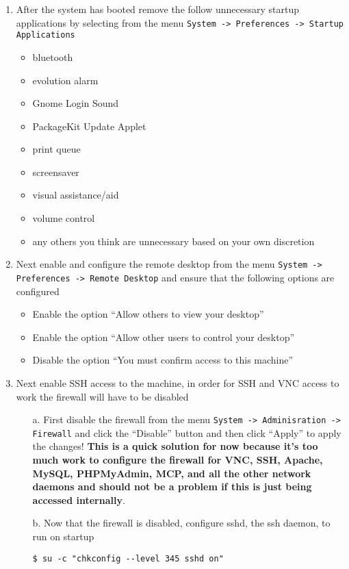 \begin{enumerate}
\item 	After the system has booted remove the follow unnecessary startup applications by selecting from the menu  
		\verb|System -> Preferences -> Startup Applications|
\begin{itemize}
\item	bluetooth
\item	evolution alarm
\item	Gnome Login Sound
\item	PackageKit Update Applet
\item	print queue
\item	screensaver
\item	visual assistance/aid
\item	volume control
\item	any others you think are unnecessary based on your own discretion
\end{itemize}

\item	Next enable and configure the remote desktop from the menu \verb|System -> Preferences -> Remote Desktop| and ensure
		that the following options are configured	
\begin{itemize}
\item	Enable the option ``Allow others to view your desktop''
\item	Enable the option ``Allow other users to control your desktop''
\item	Disable the option ``You must confirm access to this machine''
\end{itemize}

\item	Next enable SSH access to the machine, in order for SSH and VNC access to work the firewall will have to be disabled
\begin{itemize}
\item[a.]	First disable the firewall from the menu \verb|System -> Adminisration -> Firewall| and click the ``Disable'' 
			button and then click ``Apply'' to apply the changes! {\bf This is a quick solution for now because it's too 
			much work to configure the firewall for VNC, SSH, Apache, MySQL, PHPMyAdmin, MCP, and all the other network 
			daemons and should not be a problem if this is just being accessed internally}.

\item[b.]	Now that the firewall is disabled, configure sshd, the ssh daemon, to run on startup
\begin{lstlisting}
$ su -c "chkconfig --level 345 sshd on"
\end{lstlisting}
\end{itemize}


\end{enumerate}
